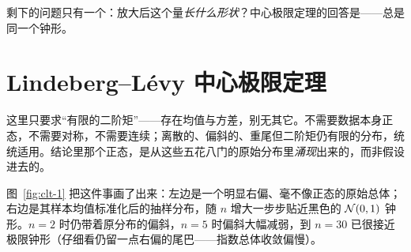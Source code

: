 
剩下的问题只有一个：放大后这个量\emph{长什么形状}？中心极限定理的回答是——总是同一个钟形。

\section{Lindeberg–Lévy 中心极限定理}
\label{sec:clt-iid}


这里只要求``有限的二阶矩''——存在均值与方差，别无其它。不需要数据本身正态，不需要对称，不需要连续；离散的、偏斜的、重尾但二阶矩仍有限的分布，统统适用。结论里那个正态，是从这些五花八门的原始分布里\emph{涌现}出来的，而非假设进去的。

图~\ref{fig:clt-1} 把这件事画了出来：左边是一个明显右偏、毫不像正态的原始总体；右边是其样本均值标准化后的抽样分布，随 $n$ 增大一步步贴近黑色的 $\mathcal{N}(0,1)$ 钟形。$n=2$ 时仍带着原分布的偏斜，$n=5$ 时偏斜大幅减弱，到 $n=30$ 已很接近极限钟形（仔细看仍留一点右偏的尾巴——指数总体收敛偏慢）。

